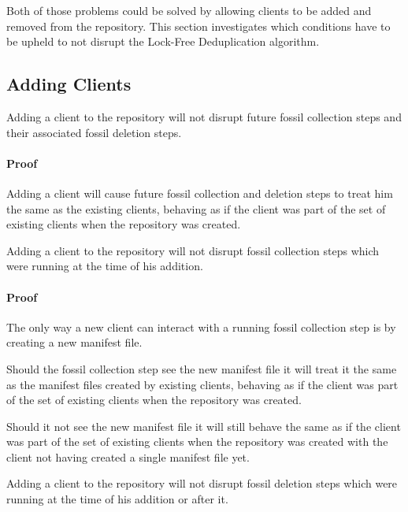 Both of those problems could be solved by allowing clients to be added and removed
from the repository.
This section investigates which conditions have to be upheld to not disrupt
the Lock-Free Deduplication algorithm.

\subsection{Adding Clients}\label{sec:adding-clients}

\begin{lem}\label{lem:adding-client-future}
    Adding a client to the repository will not disrupt future fossil collection
    steps and their associated fossil deletion steps.
\end{lem}

\paragraph{Proof} Adding a client will cause future fossil collection and deletion
steps to treat him the same as the existing clients, behaving as if the client was
part of the set of existing clients when the repository was created.

\begin{lem}\label{lem:adding-client-collection}
    Adding a client to the repository will not disrupt fossil collection steps
    which were running at the time of his addition.
\end{lem}

\paragraph{Proof} The only way a new client can interact with a running fossil
collection step is by creating a new manifest file.

Should the fossil collection step see the new manifest file it will treat it
the same as the manifest files created by existing clients, behaving as if the
client was part of the set of existing clients when the repository was created.

Should it not see the new manifest file it will still behave the same as if the
client was part of the set of existing clients when the repository was created
with the client not having created a single manifest file yet.

\begin{lem}\label{lem:adding-client-deletion}
    Adding a client to the repository will not disrupt fossil deletion steps
    which were running at the time of his addition or after it.
\end{lem}

